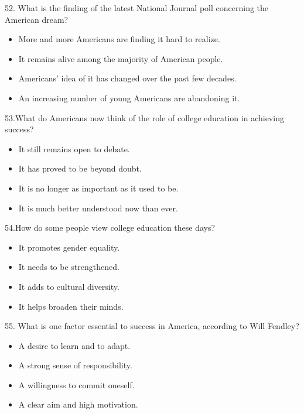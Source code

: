 \documentclass[UTF8,11pt]{ctexart}
\begin{document}
52. What is the finding of the latest National Journal poll concerning the American dream?


\begin{itemize}[leftmargin=2em,itemsep=.2em,topsep=.4em]\item[A.] More and more Americans are finding it hard to realize.
\item[B.] It remains alive among the majority of American people.
\item[C.] Americans’ idea of it has changed over the past few decades.
\item[D.] An increasing number of young Americans are abandoning it.
\end{itemize}

53.What do Americans now think of the role of college education in achieving success?


\begin{itemize}[leftmargin=2em,itemsep=.2em,topsep=.4em]\item[A.] It still remains open to debate.
\item[B.] It has proved to be beyond doubt.
\item[C.] It is no longer as important as it used to be.
\item[D.] It is much better understood now than ever.
\end{itemize}

54.How do some people view college education these days?


\begin{itemize}[leftmargin=2em,itemsep=.2em,topsep=.4em]\item[A.] It promotes gender equality.
\item[B.] It needs to be strengthened.
\item[C.] It adds to cultural diversity.
\item[D.] It helps broaden their minds.
\end{itemize}

55. What is one factor essential to success in America, according to Will Fendley?


\begin{itemize}[leftmargin=2em,itemsep=.2em,topsep=.4em]\item[A.] A desire to learn and to adapt.
\item[B.] A strong sense of responsibility.
\item[C.] A willingness to commit oneself.
\item[D.] A clear aim and high motivation.
\end{itemize}
\end{document}
